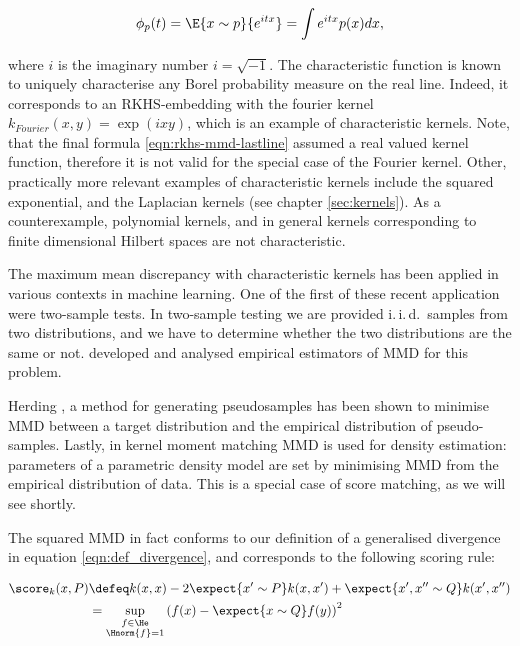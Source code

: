\begin{equation}
\phi_p(t) = \E{x\sim p}{e^{ i t x}} = \int e^{i t x} p(x) dx,
\end{equation}

where $i$ is the imaginary number $i=\sqrt{-1}$. The characteristic function is known to uniquely characterise any Borel probability measure on the real line. Indeed, it corresponds to an RKHS-embedding with the fourier kernel $k_{Fourier}(x,y) = \exp(ixy)$, which is an example of characteristic kernels. Note, that the final formula \eqref{eqn:rkhs-mmd-lastline} assumed a real valued kernel function, therefore it is not valid for the special case of the Fourier kernel. Other, practically more relevant examples of characteristic kernels include the squared exponential, and the Laplacian kernels (see chapter \ref{sec:kernels}). As a counterexample, polynomial kernels, and in general kernels corresponding to finite dimensional Hilbert spaces are not characteristic.

The maximum mean discrepancy with characteristic kernels has been applied in various contexts in machine learning. One of the first of these recent application were two-sample tests. In two-sample testing we are provided i.\,i.\,d.\ samples from two distributions, and we have to determine whether the two distributions are the same or not. \citep{Gretton2012,Gretton2009} developed and analysed empirical estimators of MMD for this problem.

Herding \citep{Welling2009,Chen2012}, a method for generating pseudosamples has been shown to minimise MMD between a target distribution and the empirical distribution of pseudo-samples. Lastly, in kernel moment matching \citep{Song2008} MMD is used for density estimation: parameters of a parametric density model are set by minimising MMD from the empirical distribution of data. This is a special case of score matching, as we will see shortly.

The squared MMD in fact conforms to our definition of a generalised divergence in equation \eqref{eqn:def_divergence}, and corresponds to the following scoring rule:

\begin{align}
	\score_{k}(x,P) &\defeq k(x,x) - 2 \expect{x'\sim P} k(x,x') + \expect{x',x''\sim Q}k(x',x'')\\
		&=  \sup_{\substack{f\in\He\\\Hnorm{f}=1}}\left( f(x)- \expect{x\sim Q} f(y) \right)^2
\end{align}

